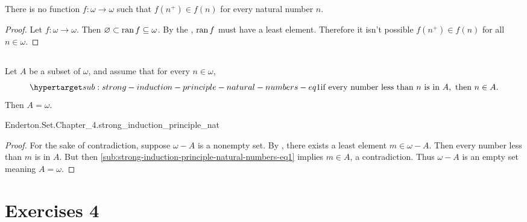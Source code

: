 \documentclass{report}
\begin{document}
\subsection{}%

  \begin{corollary}[4Q]
    There is no function $f \colon \omega \rightarrow \omega$ such that
      $f(n^+) \in f(n)$ for every natural number $n$.
  \end{corollary}

  \begin{proof}
    Let $f \colon \omega \rightarrow \omega$.
    Then $\varnothing \subset \mathop{\text{ran}}{f} \subseteq \omega$.
    By the , $\mathop{\text{ran}}{f}$ must have
      a least element.
    Therefore it isn't possible $f(n^+) \in f(n)$ for all $n \in \omega$.
  \end{proof}

\subsection{}%

  \begin{theorem}
    Let $A$ be a subset of $\omega$, and assume that for every $n \in \omega$,
      \begin{equation}
        \hyperlabel{sub:strong-induction-principle-natural-numbers-eq1}
        \text{if every number less than } n \text{ is in } A,
          \text{ then } n \in A.
      \end{equation}
    Then $A = \omega$.
  \end{theorem}

    {Enderton.Set.Chapter\_4.strong\_induction\_principle\_nat}

  \begin{proof}
    For the sake of contradiction, suppose $\omega - A$ is a nonempty set.
    By , there exists a least element
      $m \in \omega - A$.
    Then every number less than $m$ is in $A$.
    But then \eqref{sub:strong-induction-principle-natural-numbers-eq1} implies
      $m \in A$, a contradiction.
    Thus $\omega - A$ is an empty set meaning $A = \omega$.
  \end{proof}

\section{Exercises 4}%
\end{document}
